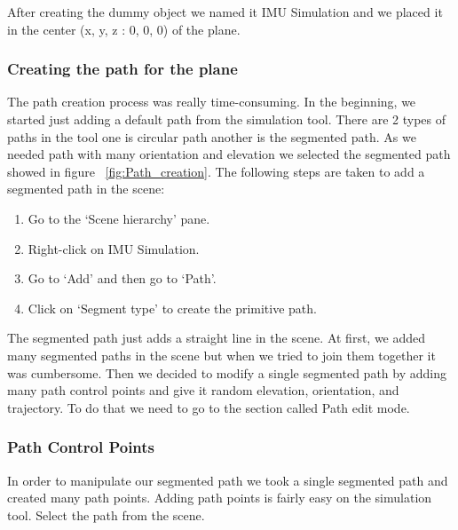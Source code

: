 After creating the dummy object we named it IMU Simulation  and we placed it in the center  (x, y, z : 0, 0, 0)  of the plane.


\subsubsection{Creating the path for the plane}

The path creation process was really time-consuming. In the beginning, we started just adding a default path from the simulation tool. There are 2 types of paths in the tool one is circular path another is the segmented path. As we needed path with many orientation and elevation we selected the segmented path showed in figure ~\ref{fig:Path_creation}.
The following steps are taken to add a segmented path in the scene:

\begin{enumerate}
  \item Go to the ‘Scene hierarchy’ pane.
  \item Right-click on IMU Simulation.
  \item Go to ‘Add’ and then go to ‘Path’.
  \item Click on ‘Segment type’ to create the primitive path.
\end{enumerate}

The segmented path just adds a straight line in the scene. At first, we added many segmented paths in the scene but when we tried to join them together it was cumbersome.
Then we decided to modify a single segmented path by adding many path control points and give it random elevation, orientation, and trajectory. To do that we need to go to the section called Path edit mode.

\subsubsection{Path Control Points}


In order to manipulate our segmented path we took a single segmented path and created many path points. Adding path points is fairly easy on the simulation tool.
Select the path from the scene.

